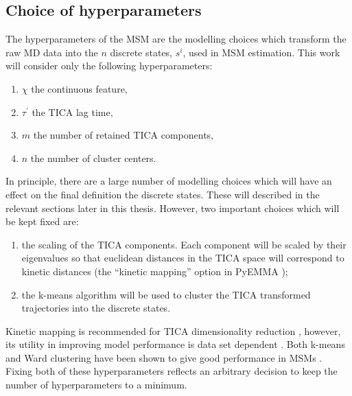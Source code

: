 \subsection{Choice of hyperparameters}
The hyperparameters of the MSM are the modelling choices which transform the raw MD data into the $n$ discrete states, $s^{i}$, used in MSM estimation. This work will consider only the following hyperparameters: 
\begin{enumerate}
    \item $\chi$ the continuous feature,
    \item $\tau^{\prime}$ the TICA lag time, 
    \item $m$ the number of retained TICA components, 
    \item $n$ the number of cluster centers. 
\end{enumerate}
In principle, there are a large number of modelling choices which will have an effect on the final definition the discrete states. These will described in the relevant sections later in this thesis. However, two important choices which will be kept fixed are: 
\begin{enumerate}
    \item the scaling of the TICA components. Each component will be scaled by their eigenvalues  so that euclidean distances in the TICA space will correspond to kinetic distances \cite{noeKineticDistanceKinetic2015} (the ``kinetic mapping'' option in PyEMMA \cite{schererPyEMMASoftwarePackage2015a});
    \item the k-means \cite{lloydLeastSquaresQuantization1982} algorithm will be used to cluster the TICA transformed trajectories into the discrete states. 
\end{enumerate}
Kinetic mapping is recommended for TICA dimensionality reduction \cite{noeKineticDistanceKinetic2015}, however, its utility in improving model performance is data set dependent \cite{husicOptimizedParameterSelection2016}.  Both k-means and Ward clustering have been shown to give good performance in MSMs \cite{husicWardClusteringImproves2017a}. Fixing both of these hyperparameters reflects an arbitrary decision to keep the number of hyperparameters to a minimum.

